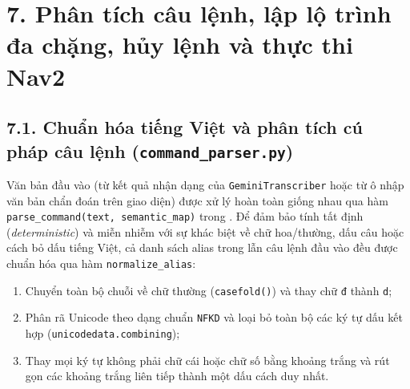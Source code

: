 \section*{7. Phân tích câu lệnh, lập lộ trình đa chặng, hủy lệnh và thực thi Nav2}

\subsection*{7.1. Chuẩn hóa tiếng Việt và phân tích cú pháp câu lệnh (\texttt{command\_parser.py})}

Văn bản đầu vào (từ kết quả nhận dạng của \texttt{GeminiTranscriber} hoặc từ ô nhập văn bản chẩn đoán trên giao diện) được xử lý hoàn toàn giống nhau qua hàm \texttt{parse\_command(text, semantic\_map)} trong . Để đảm bảo tính tất định (\textit{deterministic}) và miễn nhiễm với sự khác biệt về chữ hoa/thường, dấu câu hoặc cách bỏ dấu tiếng Việt, cả danh sách alias trong  lẫn câu lệnh đầu vào đều được chuẩn hóa qua hàm \texttt{normalize\_alias}:
\begin{enumerate}[leftmargin=1.2cm]
  \item Chuyển toàn bộ chuỗi về chữ thường (\texttt{casefold()}) và thay chữ \texttt{đ} thành \texttt{d};
  \item Phân rã Unicode theo dạng chuẩn \texttt{NFKD} và loại bỏ toàn bộ các ký tự dấu kết hợp (\texttt{unicodedata.combining});
  \item Thay mọi ký tự không phải chữ cái hoặc chữ số bằng khoảng trắng và rút gọn các khoảng trắng liên tiếp thành một dấu cách duy nhất.
\end{enumerate}


